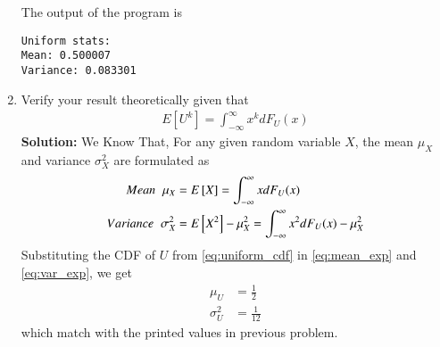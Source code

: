 \documentclass[journal,10pt,twocolumn]{IEEEtran}
\newcounter{Chapcounter}
\numberwithin{equation}{subsection}
\numberwithin{figure}{subsection}
\renewcommand\thesection{\theChapcounter.\arabic{section}}
\providecommand{\sbrak}[1]{\ensuremath{{}\left[#1\right]}}
\newcommand{\solution}{\noindent \textbf{Solution: }}
\renewcommand\thesection{\arabic{section}}
\renewcommand\thesubsection{\thesection.\arabic{subsection}}
\begin{document}
\begin{enumerate}[label=\thesubsection.\arabic*,ref=\thesubsection.\arabic{figure}]
The output of the program is
\begin{lstlisting}
Uniform stats:
Mean: 0.500007
Variance: 0.083301
\end{lstlisting}
\item Verify your result theoretically given that
%
\begin{align}
E\sbrak{U^k} = \int_{-\infty}^{\infty}x^kdF_{U}(x)
\label{eq:expe1}
\end{align}
\solution We Know That, For any given random variable $X$, the mean $\mu_X$ and variance $\sigma_X^2$ are formulated as
\begin{align}
	\label{eq:mean_exp}
	Mean \hspace{0.2cm} \mu_X &= E\sbrak{X} = \int_{-\infty}^{\infty}xdF_{U}(x) \\
	\label{eq:var_exp}
	Variance \hspace{0.2cm} \sigma_X^2 &= E\sbrak{X^2} - \mu_X^2 = \int_{-\infty}^{\infty}x^2dF_{U}(x) - \mu_X^2
\end{align}  
Substituting the CDF of $U$ from \eqref{eq:uniform_cdf} in \eqref{eq:mean_exp} and \eqref{eq:var_exp}, we get
\begin{align}
	\label{eq:mean_uni}
	\mu_U &= \frac{1}{2} \\
	\label{eq:var_uni}
	\sigma_U^2 &= \frac{1}{12}
\end{align}  
which match with the printed values in previous problem.
\end{enumerate}
\end{document}

